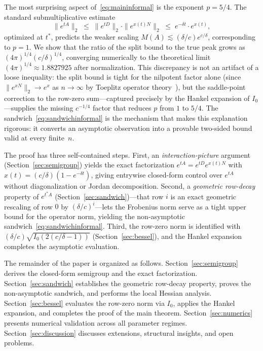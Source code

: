 \documentclass[11pt,reqno]{article}
\theoremstyle{plain}
\theoremstyle{definition}
\theoremstyle{remark}
\numberwithin{equation}{section}
\begin{document}
The most surprising aspect of~\eqref{eq:maininformal} is the exponent $p = 5/4$. The standard submultiplicative estimate
\begin{equation}\label{eq:submult_intro}
  \|e^{tA}\|_2 \;\le\; \|e^{tD}\|_2 \cdot \|e^{x(t)N}\|_2 \;\le\; e^{-\delta t} \cdot e^{x(t)},
\end{equation}
optimized at $t^*$, predicts the weaker scaling $M(A) \lesssim (\delta/c)e^{c/\delta}$, corresponding to $p = 1$. We show that the ratio of the split bound to the true peak grows as $(4\pi)^{1/4}(c/\delta)^{1/4}$, converging numerically to the theoretical limit $(4\pi)^{1/4} \approx 1.8827925$ after normalization. This discrepancy is not an artifact of a loose inequality: the split bound is tight for the nilpotent factor alone (since $\|e^{xN}\|_2 \to e^x$ as $n \to \infty$ by Toeplitz operator theory~\cite{Bottcher2006,Trefethen2005}), but the saddle-point correction to the row-zero sum---captured precisely by the Hankel expansion of $I_0$---supplies the missing $c^{-1/4}$ factor that reduces $p$ from $1$ to $5/4$. The sandwich~\eqref{eq:sandwichinformal} is the mechanism that makes this explanation rigorous: it converts an asymptotic observation into a provable two-sided bound valid at every finite~$n$.

The proof has three self-contained steps. First, an \emph{interaction-picture} argument (Section~\ref{sec:semigroup}) yields the exact factorization $e^{tA} = e^{tD}e^{x(t)N}$ with $x(t) = (c/\delta)(1 - e^{-\delta t})$, giving entrywise closed-form control over $e^{tA}$ without diagonalization or Jordan decomposition. Second, a \emph{geometric row-decay} property of $e^{t^*A}$ (Section~\ref{sec:sandwich})---that row $i$ is an exact geometric rescaling of row $0$ by $(\delta/c)^i$---lets the Frobenius norm serve as a tight upper bound for the operator norm, yielding the non-asymptotic sandwich~\eqref{eq:sandwichinformal}. Third, the row-zero norm is identified with $(\delta/c)\sqrt{I_0(2(c/\delta - 1))}$ (Section~\ref{sec:bessel}), and the Hankel expansion completes the asymptotic evaluation.

The remainder of the paper is organized as follows. Section~\ref{sec:semigroup} derives the closed-form semigroup and the exact factorization. Section~\ref{sec:sandwich} establishes the geometric row-decay property, proves the non-asymptotic sandwich, and performs the local Hessian analysis. Section~\ref{sec:bessel} evaluates the row-zero norm via $I_0$, applies the Hankel expansion, and completes the proof of the main theorem. Section~\ref{sec:numerics} presents numerical validation across all parameter regimes. Section~\ref{sec:discussion} discusses extensions, structural insights, and open problems.
\end{document}
